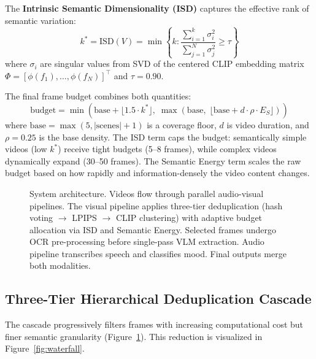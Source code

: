The \textbf{Intrinsic Semantic Dimensionality (ISD)} captures the effective rank of semantic variation:
\begin{equation}
\label{eq:isd}
k^* = \text{ISD}(V) = \min\left\{k : \frac{\sum_{i=1}^k \sigma_i^2}{\sum_{j=1}^N \sigma_j^2} \geq \tau\right\}
\end{equation}
where $\sigma_i$ are singular values from SVD of the centered CLIP embedding matrix $\Phi = [\phi(f_1), \ldots, \phi(f_N)]^\top$ and $\tau = 0.90$.

The final frame budget combines both quantities:
\begin{equation}
\label{eq:budget}
\text{budget} = \min\!\left(\text{base} + \lfloor 1.5 \cdot k^* \rfloor,\; \max\!\left(\text{base},\; \lfloor \text{base} + d \cdot \rho \cdot E_S \rfloor\right)\right)
\end{equation}
where $\text{base} = \max(5, |\text{scenes}| + 1)$ is a coverage floor, $d$ is video duration, and $\rho = 0.25$ is the base density. The ISD term caps the budget: semantically simple videos (low $k^*$) receive tight budgets (5--8 frames), while complex videos dynamically expand (30--50 frames). The Semantic Energy term scales the raw budget based on how rapidly and information-densely the video content changes.




\begin{figure}[t]
\centering

\caption{System architecture. Videos flow through parallel audio-visual pipelines. The visual pipeline applies three-tier deduplication (hash voting $\rightarrow$ LPIPS $\rightarrow$ CLIP clustering) with adaptive budget allocation via ISD and Semantic Energy. Selected frames undergo OCR pre-processing before single-pass VLM extraction. Audio pipeline transcribes speech and classifies mood. Final outputs merge both modalities.}
\label{fig:architecture}
\end{figure}

\subsection{Three-Tier Hierarchical Deduplication Cascade}
\label{sec:cascade}

The cascade progressively filters frames with increasing computational cost but finer semantic granularity (Figure~\ref{fig:architecture}). This reduction is visualized in Figure~\ref{fig:waterfall}.

